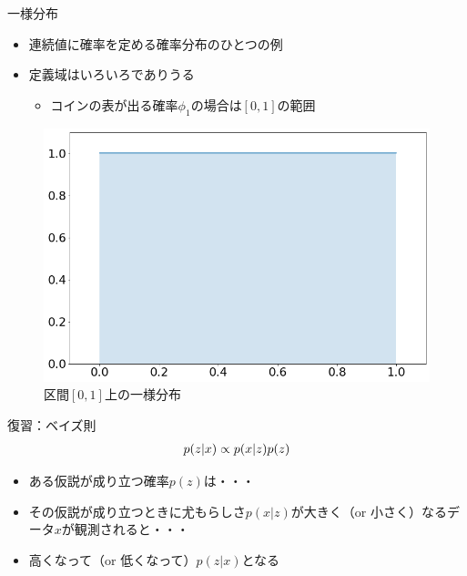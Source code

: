 \documentclass[aspectratio=169,unicode,dvipdfmx,14pt]{beamer}
\begin{document}
\begin{frame}{一様分布}
\begin{itemize}
\item 連続値に確率を定める確率分布のひとつの例
\item 定義域はいろいろでありうる
\begin{itemize}
\item コインの表が出る確率$\phi_1$の場合は$[0,1]$の範囲
\end{itemize}
\end{itemize}
\begin{figure}[htbp]
\begin{center}
\includegraphics[scale=0.27]{uniform_dist.png}
\vspace{-.2in}
\caption{区間$[0,1]$上の一様分布}
\label{}
\end{center}
\end{figure}
\end{frame}

\begin{frame}{復習：ベイズ則}
\vspace{-.4in}
{\Large
\begin{align}
p(z|x) \propto p(x|z)p(z)
\notag
\end{align}
}%
\vspace{-.2in}
\begin{itemize}
\item ある仮説が成り立つ確率$p(z)$は・・・
\item その仮説が成り立つときに尤もらしさ$p(x|z)$が大きく（or 小さく）なるデータ$x$が観測されると・・・
\item 高くなって（or 低くなって）$p(z|x)$となる
\end{itemize}
\end{frame}
\end{document}
